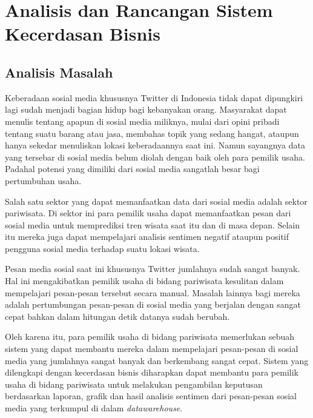 \chapter{Analisis dan Rancangan Sistem Kecerdasan Bisnis}

\section{Analisis Masalah}
Keberadaan sosial media khususnya Twitter di Indonesia tidak dapat dipungkiri lagi sudah menjadi bagian hidup bagi kebanyakan orang. Masyarakat dapat menulis tentang apapun di sosial media miliknya, mulai dari opini pribadi tentang suatu barang atau jasa, membahas topik yang sedang hangat, ataupun hanya sekedar menuliskan lokasi keberadaannya saat ini. Namun sayangnya data yang tersebar di sosial media belum diolah dengan baik oleh para pemilik usaha. Padahal potensi yang dimiliki dari sosial media sangatlah besar bagi pertumbuhan usaha.

Salah satu sektor yang dapat memanfaatkan data dari sosial media adalah sektor pariwisata. Di sektor ini para pemilik usaha dapat memanfaatkan pesan dari sosial media untuk memprediksi tren wisata saat itu dan di masa depan. Selain itu mereka juga dapat mempelajari analisis sentimen negatif ataupun positif pengguna sosial media terhadap suatu lokasi wisata. 

Pesan media sosial saat ini khususnya Twitter jumlahnya sudah sangat banyak. Hal ini mengakibatkan pemilik usaha di bidang pariwisata kesulitan dalam mempelajari pesan-pesan tersebut secara manual. Masalah lainnya bagi mereka adalah pertumbungan pesan-pesan di sosial media yang berjalan dengan sangat cepat bahkan dalam hitungan detik datanya sudah berubah. 

Oleh karena itu, para pemilik usaha di bidang pariwisata memerlukan sebuah sistem yang dapat membantu mereka dalam mempelajari pesan-pesan di sosial media yang jumlahnya sangat banyak dan berkembang sangat cepat. Sistem yang dilengkapi dengan kecerdasan bisnis diharapkan dapat membantu para pemilik usaha di bidang pariwisata untuk melakukan pengambilan keputusan berdasarkan laporan, grafik dan hasil analisis sentimen dari pesan-pesan sosial media yang terkumpul di dalam \textit{datawarehouse}.


